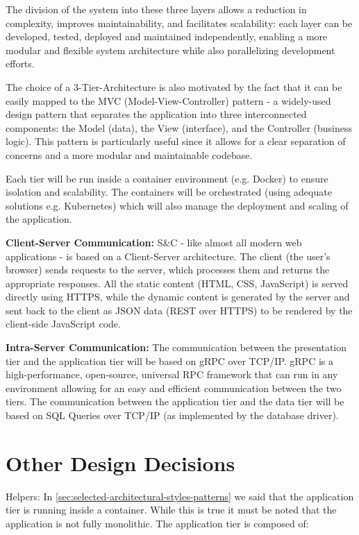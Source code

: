 The division of the system into these three layers allows a reduction in complexity, improves maintainability, and
facilitates scalability: each layer can be developed, tested, deployed and maintained independently, enabling a more
modular and flexible system architecture while also parallelizing development efforts.

The choice of a 3-Tier-Architecture is also motivated by the fact that it can be easily mapped to the MVC
(Model-View-Controller) pattern - a widely-used design pattern that separates the application into three interconnected
components: the Model (data), the View (interface), and the Controller (business logic). This pattern is particularly
useful since it allows for a clear separation of concerns and a more modular and maintainable codebase.

Each tier will be run inside a container environment (e.g. Docker) to ensure isolation and scalability. The containers
will be orchestrated (using adequate solutions e.g. Kubernetes) which will also manage the deployment and scaling of
the application.

\par{\textbf{Client-Server Communication:}} S\&C - like almost all modern web applications - is based on a
Client-Server architecture. The client (the user's browser) sends requests to the server, which processes them and
returns the appropriate responses. All the static content (HTML, CSS, JavaScript) is served directly using HTTPS, while
the dynamic content is generated by the server and sent back to the client as JSON data (REST over HTTPS) to be
rendered by the client-side JavaScript code.

\par{\textbf{Intra-Server Communication:}} The communication between the presentation tier and the application tier
will be based on gRPC over TCP/IP. gRPC is a high-performance, open-source, universal RPC framework that can run in any
environment allowing for an easy and efficient communication between the two tiers. The communication between the
application tier and the data tier will be based on SQL Queries over TCP/IP (as implemented by the database driver).

\section{Other Design Decisions}
\label{sec:other-design-decisions}%

\par{Helpers:} In \ref{sec:selected-architectural-styles-patterns} we said that the application tier is running inside a
container. While this is true it must be noted that the application is not fully monolithic. The application tier is
composed of:


